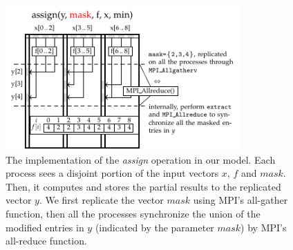 \documentclass{sokendai_thesis} %
\begin{document}
\begin{figure}
\centering
\includegraphics[width=0.8\textwidth]{figures/assign-impl.pdf}
\caption{The implementation of the \emph{assign} operation in our model. Each process sees a disjoint portion of the input vectors $x$, $f$ and $\mathit{mask}$. Then, it computes and stores the partial results to the replicated vector $y$. We first replicate the vector $\mathit{mask}$ using MPI's all-gather function, then all the processes synchronize the union of the modified entries in $y$ (indicated by the parameter $\mathit{mask}$) by MPI's all-reduce function.}
\vspace{-8pt}
\label{fig:assign-impl}
\end{figure}
\end{document}
